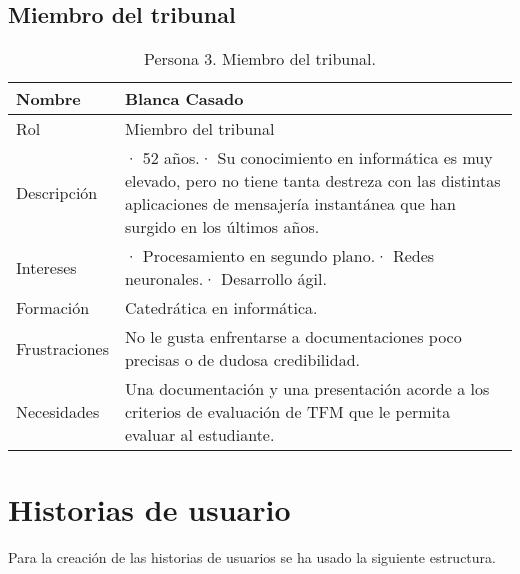\subsection{Miembro del tribunal}
\label{sec:personaMiembroTribunal}
\begin{table}[H]
    \centering
    \def\arraystretch{1.25}
    \begin{adjustbox}{max width=\textwidth}
    \begin{tabularx}{\textwidth}{|l|L|}
    \hline
        \textbf{Nombre} & \textbf{Blanca Casado} \\ \hline
    \hline
        Rol & Miembro del tribunal \\ \hline
        Descripción & · 52 años.\linebreak · Su conocimiento en informática es muy elevado, pero no tiene tanta destreza con las distintas aplicaciones de mensajería instantánea que han surgido en los últimos años. \\ \hline
        Intereses & · Procesamiento en segundo plano.\linebreak · Redes neuronales.\linebreak · Desarrollo ágil. \\ \hline
        Formación & Catedrática en informática. \\ \hline
        Frustraciones & No le gusta enfrentarse a documentaciones poco precisas o de dudosa credibilidad. \\ \hline
        Necesidades & Una documentación y una presentación acorde a los criterios de evaluación de TFM que le permita evaluar al estudiante. \\ \hline
    \end{tabularx}
    \end{adjustbox}
    \caption{Persona 3. Miembro del tribunal.}
\end{table}

\section{Historias de usuario}

Para la creación de las historias de usuarios se ha usado la siguiente estructura.

